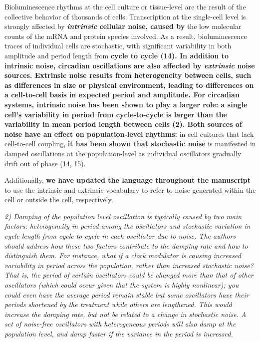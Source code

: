 \documentclass[11pt, letterpaper]{article}
\newenvironment{reviewer}{\itshape\color{gray}}{}
\newenvironment{manuscript}[1]{\begin{center}\begin{tcolorbox}[colback=green!5!white,colframe=green!75!black,width=\textwidth,title={#1},breakable,fonttitle=\bfseries]}{\end{tcolorbox}\end{center}}
\begin{document}
\begin{manuscript}{Page 3}
Bioluminescence rhythms at the cell culture or tissue-level are the result of the collective behavior of thousands of cells. 
Transcription at the single-cell level is strongly affected by {\bfseries {\itshape intrinsic} cellular noise, caused by} the low molecular counts of the mRNA and protein species involved. As a result, bioluminescence traces of individual cells are stochastic, with significant variability in both amplitude and period length from {\bfseries cycle to cycle (14). In addition to intrinsic noise, circadian oscillations are also affected by {\itshape extrinsic} noise sources. Extrinsic noise results from heterogeneity between cells, such as differences in size or physical environment, leading to differences on a cell-to-cell basis in expected period and amplitude. For circadian systems, intrinsic noise has been shown to play a larger role: a single cell's variability in period from cycle-to-cycle is larger than the variability in mean period length between cells (2). Both sources of noise have an effect on population-level rhythms:} in cell cultures that lack cell-to-cell coupling, {\bfseries it has been shown that stochastic noise} is manifested in damped oscillations at the population-level as individual oscillators gradually drift out of phase (14, 15).

\end{manuscript}

Additionally, {\bfseries we have updated the language throughout the manuscript} to use the intrinsic and extrinsic vocabulary to refer to noise generated within the cell or outside the cell, respectively.

\begin{reviewer}
2) Damping of the population level oscillation is typically caused by two main factors: heterogeneity in period among the oscillators and stochastic variation in cycle length from cycle to cycle in each oscillator due to noise. 
The authors should address how these two factors contribute to the damping rate and how to distinguish them. 
For instance, what if a clock modulator is causing increased variability in period across the population, rather than increased stochastic noise? That is, the period of certain oscillators could be changed more than that of other oscillators (which could occur given that the system is highly nonlinear); you could even have the average period remain stable but some oscillators have their periods shortened by the treatment while others are lengthened. 
This would increase the damping rate, but not be related to a change in stochastic noise. 
A set of noise-free oscillators with heterogeneous periods will also damp at the population level, and damp faster if the variance in the period is increased.
\end{reviewer}
\end{document}
